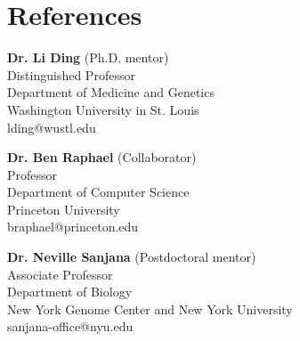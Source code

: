 \documentclass[letterpaper,11pt]{cv}
\begin{document}
\section{References}
\begin{multicols*}{2}

    \begin{entrylist}
    
        \item \textbf{Dr. Li Ding} (Ph.D. mentor) \\
        Distinguished Professor\\
        Department of Medicine and Genetics\\
        Washington University in St. Louis\\
        lding@wustl.edu

        \item \textbf{Dr. Ben Raphael} (Collaborator) \\
        Professor\\
        Department of Computer Science\\
        Princeton University\\
        braphael@princeton.edu
    
        \columnbreak
        \item \textbf{Dr. Neville Sanjana} (Postdoctoral mentor) \\
        Associate Professor\\
        Department of Biology\\
        New York Genome Center and New York University\\
        sanjana-office@nyu.edu

    \end{entrylist}
    
    \raggedcolumns
    \end{multicols*}
\end{document}
